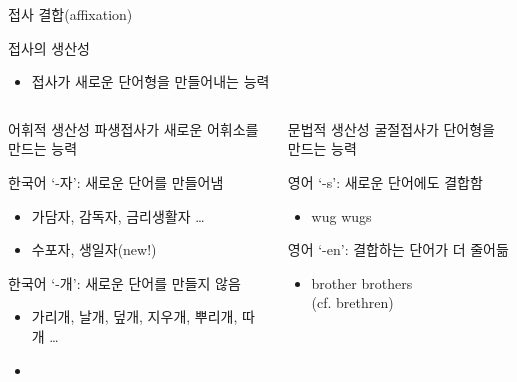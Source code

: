 \documentclass[11pt, aspectratio=169]{beamer}
\begin{document}
\begin{frame}[t]{접사 결합(affixation)}
  \begin{block}{접사의 생산성}
    \begin{itemize}
      \item 접사가 새로운 단어형을 만들어내는 능력
    \end{itemize}
  \end{block}
  \begin{columns}
    \begin{column}[T]{0.46\textwidth}
      \begin{block}{어휘적 생산성}
        파생접사가 새로운 어휘소를 만드는 능력
      \end{block}
      한국어 ‘-자’: 새로운 단어를 만들어냄
      \begin{itemize}
        \item 가담자, 감독자, 금리생활자 \dots 
        \item 수포자, 생일자(new!)
      \end{itemize}
      한국어 ‘-개’: 새로운 단어를 만들지 않음
      \begin{itemize}
        \item 가리개, 날개, 덮개, 지우개, 뿌리개, 따개 \dots 
        \item []
      \end{itemize}
    \end{column}
    \begin{column}[T]{0.47\textwidth}
      \begin{block}{문법적 생산성}
        굴절접사가 단어형을 만드는 능력
      \end{block}
      영어 ‘-s’: 새로운 단어에도 결합함
      \begin{itemize}
        \item wug \rightarrow wugs
      \end{itemize}
      영어 ‘-en’: 결합하는 단어가 더 줄어듦
      \begin{itemize}
        \item brother \rightarrow brothers \\ (cf. brethren)
      \end{itemize}
    \end{column}
  \end{columns}
\end{frame}
\end{document}
